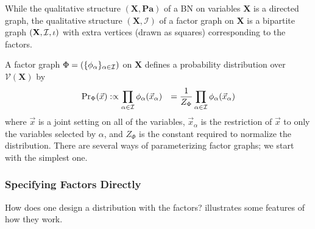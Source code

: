 \documentclass{article}
\newcommand{\V}{\mathcal V}
\newcommand{\N}{\mathcal N}
\newcommand{\Ed}{\mathcal E}
\numberwithin{equation}{section}
\begin{document}
\begin{notfocus}
\begin{fulldefn}
\end{fulldefn}

	While the qualitative structure $(\mathbf X, \mathbf{Pa})$ of a BN on variables $\mathbf X$ is a directed graph, the qualitative structure $(\mathbf X, \mathcal I)$ of a factor graph on $\mathbf X$ is
	a bipartite graph $({\mathbf X, \cal I}, \iota)$ with extra vertices (drawn as squares) corresponding to the factors. 
	
	
	
	
	A factor graph $\Phi = (\{\phi_\alpha\}_{\alpha \in \cal I})$ on $\mathbf X$ defines a probability distribution over $\V(\mathbf X)$ by 
	\begin{align*}
		\Pr\nolimits_\Phi(\vec x) &:\propto \prod_{\alpha \in \cal I} \phi_\alpha(\vec x_{\alpha}) 
		&= \frac{1}{Z_\Phi} \prod_{\alpha \in \cal I} \phi_\alpha(\vec x_{\alpha})
	\end{align*}
	where $\vec{x}$ is a joint setting on all of the variables, $\vec{x}_\alpha$ is the restriction of $\vec{x}$ to only the variables selected by $\alpha$, and $Z_\Phi$ is the constant required to normalize the distribution. 
	There are several ways of parameterizing factor graphs; we start with the simplest one.
		
	\subsubsection{Specifying Factors Directly}

	How does one design a distribution with the factors?  illustrates some features of how they work.
	\begin{figure*}[t!]
		\centering
		\begin{subfigure}[b]{0.22\textwidth}
\end{subfigure}
\end{figure*}
\end{notfocus}
\end{document}
